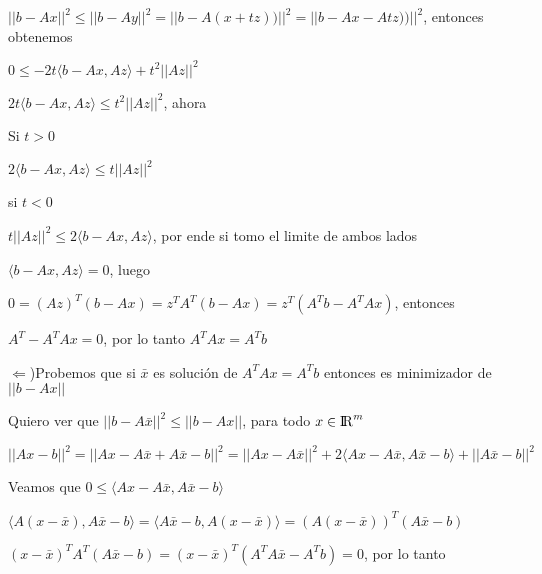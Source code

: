 \documentclass{article}
\begin{document}
$||b - Ax||^2 \leq ||b-Ay||^2 =||b-A(x+ tz))||^2 = ||b- Ax - Atz))||^2 $, entonces obtenemos

\vspace{5mm}

$0 \leq -2t\langle b-Ax, Az \rangle + t^2||Az||^2$

\vspace{5mm}

$2t\langle b-Ax, Az \rangle \leq t^2||Az||^2 $, ahora

\vspace{5mm}

Si $t > 0$

$2\langle b-Ax, Az \rangle \leq t||Az||^2$

si $t<0$

$t||Az||^2 \leq 2\langle b-Ax, Az \rangle$, por ende si tomo el limite de ambos lados

\vspace{5mm}

$\langle b-Ax, Az \rangle = 0$, luego

$0 = (Az)^T(b-Ax)=z^TA^T(b-Ax)=z^T(A^Tb-A^TAx)$, entonces

$A^T-A^TAx=0$, por lo tanto $A^TAx=A^Tb$

\vspace{5mm}

$\Leftarrow$)Probemos que si $\bar{x}$ es solución de $A^TAx=A^Tb$ entonces es minimizador de $||b-Ax||$

Quiero ver que $||b-A\bar{x}||^2 \leq ||b-Ax||$, para todo $x \in {\rm I\!R}^m$

\vspace{5mm}

$||Ax-b||^2= ||Ax-A\bar{x}+A\bar{x}-b||^2=||Ax-A\bar{x}||^2+2\langle Ax-A\bar{x}, A\bar{x}-b \rangle+||A\bar{x}-b||^2$

\vspace{5mm}

Veamos que $0 \leq \langle Ax-A\bar{x}, A\bar{x}-b \rangle$

\vspace{5mm}

$\langle A(x-\bar{x}), A\bar{x}-b \rangle = \langle A\bar{x}-b , A(x-\bar{x})\rangle =  (A(x-\bar{x}))^T (A\bar{x}-b) $

\vspace{5mm}

$(x-\bar{x})^TA^T (A\bar{x}-b) = (x-\bar{x})^T (A^TA\bar{x}-A^Tb) = 0$, por lo tanto

\vspace{5mm}
\end{document}
